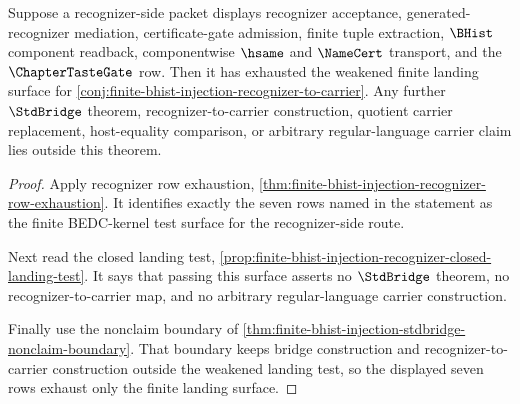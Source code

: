 \begin{theorem}
\label{thm:finite-bhist-injection-seven-row-landing-exhaustion}
Suppose a recognizer-side packet displays recognizer acceptance, generated-recognizer mediation, certificate-gate admission, finite tuple extraction, $\BHist$ component readback, componentwise $\hsame$ and $\NameCert$ transport, and the $\ChapterTasteGate$ row. Then it has exhausted the weakened finite landing surface for \autoref{conj:finite-bhist-injection-recognizer-to-carrier}. Any further $\StdBridge$ theorem, recognizer-to-carrier construction, quotient carrier replacement, host-equality comparison, or arbitrary regular-language carrier claim lies outside this theorem.
\end{theorem}
\begin{proof}
Apply recognizer row exhaustion, \autoref{thm:finite-bhist-injection-recognizer-row-exhaustion}. It identifies exactly the seven rows named in the statement as the finite BEDC-kernel test surface for the recognizer-side route.

Next read the closed landing test, \autoref{prop:finite-bhist-injection-recognizer-closed-landing-test}. It says that passing this surface asserts no $\StdBridge$ theorem, no recognizer-to-carrier map, and no arbitrary regular-language carrier construction.

Finally use the nonclaim boundary of \autoref{thm:finite-bhist-injection-stdbridge-nonclaim-boundary}. That boundary keeps bridge construction and recognizer-to-carrier construction outside the weakened landing test, so the displayed seven rows exhaust only the finite landing surface.
\end{proof}

